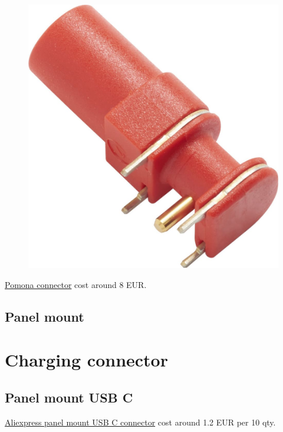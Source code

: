 \documentclass[11pt]{article}
\begin{document}
\begin{figure}[H]
  \centering 
  \includegraphics[scale=0.1]{"./figs/pomona.jpg"}
\end{figure}



\href{https://www.mouser.co.uk/ProductDetail/Pomona-Electronics/73099-2?qs=B6kkDfuK7%2FA6DpEPKtHqWw%3D%3D}{Pomona connector} 
  cost around 8 EUR.


\subsection{Panel mount}

\section{Charging connector}
\subsection{Panel mount USB C}

\href{https://www.aliexpress.com/item/1005005795420370.html?spm=a2g0o.detail.pcDetailTopMoreOtherSeller.8.7952vy1gvy1gDZ&gps-id=pcDetailTopMoreOtherSeller&scm=1007.40000.327270.0&scm_id=1007.40000.327270.0&scm-url=1007.40000.327270.0&pvid=2700dcaa-0eb6-4b0e-88eb-943a58278a62&_t=gps-id:pcDetailTopMoreOtherSeller,scm-url:1007.40000.327270.0,pvid:2700dcaa-0eb6-4b0e-88eb-943a58278a62,tpp_buckets:668%232846%238115%232000&pdp_npi=4%40dis%21RSD%2122.34%2118.09%21%21%210.21%210.17%21%402101ef5e17281249438301346ebeab%2112000034381437374%21rec%21SRB%21%21ABXZ&utparam-url=scene%3ApcDetailTopMoreOtherSeller%7Cquery_from%3A}{Aliexpress panel mount USB C connector}
cost around 1.2 EUR per 10 qty.\\
\end{document}
